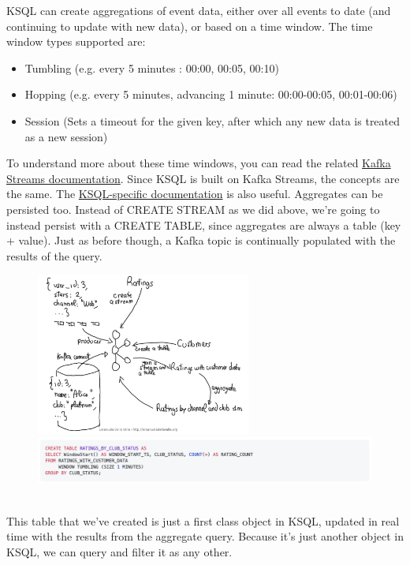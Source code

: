\documentclass[10pt,a4paper]{article}
\begin{document}
\begin{enumerate}
 KSQL can create aggregations of event data, either over all events to date (and continuing to update with new data), or based on a time window. The time window types supported are:
 \begin{itemize}
 	\item Tumbling (e.g. every 5 minutes : 00:00, 00:05, 00:10)
 	\item Hopping (e.g. every 5 minutes, advancing 1 minute: 00:00-00:05, 00:01-00:06)
 	\item Session (Sets a timeout for the given key, after which any new data is treated as a new session)
 \end{itemize}
 To understand more about these time windows, you can read the related \href{https://docs.confluent.io/current/streams/developer-guide/dsl-api.html#windowing}{Kafka Streams documentation}. Since KSQL is built on Kafka Streams, the concepts are the same. The \href{https://docs.ksqldb.io/en/latest/tutorials/examples/}{KSQL-specific documentation} is also useful. 
 \pagebreak
 Aggregates can be persisted too. Instead of CREATE STREAM as we did above, we’re going to instead persist with a CREATE TABLE, since aggregates are always a table (key + value). Just as before though, a Kafka topic is continually populated with the results of the query.
   \begin{figure}[ht!]
  \hfill \includegraphics[width=200pt]{images/ksql-demo-9}\hspace*{\fill}
\vspace{0.1em} \center 
 \hfill \includegraphics[width=400pt]{images/ksql-cmd23}\hspace*{\fill}
\end{figure} \\
This table that we’ve created is just a first class object in KSQL, updated in real time with the results from the aggregate query. Because it’s just another object in KSQL, we can query and filter it as any other.

\end{enumerate}
\end{document}
